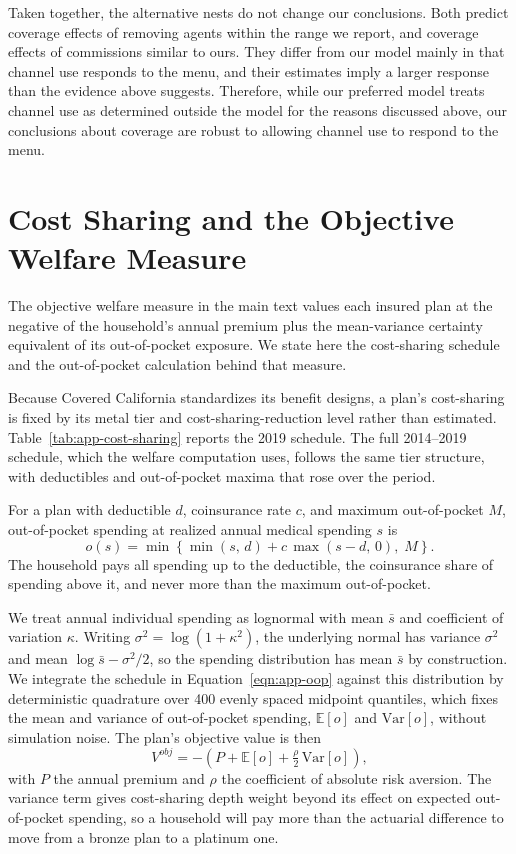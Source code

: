 \documentclass[12pt]{article}
\begin{document}
Taken together, the alternative nests do not change our conclusions. Both predict coverage effects of removing agents within the range we report, and coverage effects of commissions similar to ours. They differ from our model mainly in that channel use responds to the menu, and their estimates imply a larger response than the evidence above suggests. Therefore, while our preferred model treats channel use as determined outside the model for the reasons discussed above, our conclusions about coverage are robust to allowing channel use to respond to the menu.


\section{Cost Sharing and the Objective Welfare Measure}
\label{app:welfare}

The objective welfare measure in the main text values each insured plan at the negative of the household's annual premium plus the mean-variance certainty equivalent of its out-of-pocket exposure. We state here the cost-sharing schedule and the out-of-pocket calculation behind that measure.

Because Covered California standardizes its benefit designs, a plan's cost-sharing is fixed by its metal tier and cost-sharing-reduction level rather than estimated. Table~\ref{tab:app-cost-sharing} reports the 2019 schedule. The full 2014--2019 schedule, which the welfare computation uses, follows the same tier structure, with deductibles and out-of-pocket maxima that rose over the period.

For a plan with deductible $d$, coinsurance rate $c$, and maximum out-of-pocket $M$, out-of-pocket spending at realized annual medical spending $s$ is
\begin{equation}
\label{eqn:app-oop}
o(s) = \min\!\left\{\min(s,\,d) + c\,\max(s-d,\,0),\; M\right\}.
\end{equation}
The household pays all spending up to the deductible, the coinsurance share of spending above it, and never more than the maximum out-of-pocket.

We treat annual individual spending as lognormal with mean $\bar{s}$ and coefficient of variation $\kappa$. Writing $\sigma^2 = \log(1+\kappa^2)$, the underlying normal has variance $\sigma^2$ and mean $\log \bar{s} - \sigma^2/2$, so the spending distribution has mean $\bar{s}$ by construction. We integrate the schedule in Equation~\eqref{eqn:app-oop} against this distribution by deterministic quadrature over 400 evenly spaced midpoint quantiles, which fixes the mean and variance of out-of-pocket spending, $\mathbb{E}[o]$ and $\mathrm{Var}[o]$, without simulation noise. The plan's objective value is then
\begin{equation}
\label{eqn:app-vobj}
V^{obj} = -\left(P + \mathbb{E}[o] + \tfrac{\rho}{2}\,\mathrm{Var}[o]\right),
\end{equation}
with $P$ the annual premium and $\rho$ the coefficient of absolute risk aversion. The variance term gives cost-sharing depth weight beyond its effect on expected out-of-pocket spending, so a household will pay more than the actuarial difference to move from a bronze plan to a platinum one.
\end{document}
